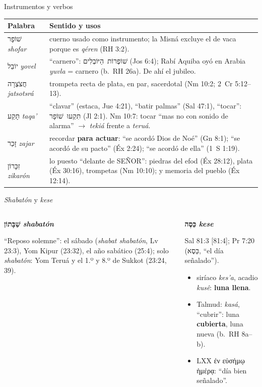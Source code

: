 \documentclass[hyperref={bookmarks=false},aspectratio=169]{beamer}
\newcommand{\heb}[1]{\mbox{\foreignlanguage{hebrew}{#1}}}
\newcommand{\grc}[1]{\foreignlanguage{ancientgreek}{#1}}
\newcommand{\SENOR}{S{\fontsize{0.78em}{1em}\selectfont EÑOR}}
\newcommand{\destacar}[1]{\textbf{\textcolor{tierraroja}{#1}}}
\begin{document}
\begin{frame}{Instrumentos y verbos}
\scriptsize\renewcommand{\arraystretch}{1.15}
\begin{tabular}{@{}L{2.5cm}L{9.0cm}@{}}
\toprule
\textbf{Palabra} & \textbf{Sentido y usos} \\ \midrule
\heb{שׁוֹפָר} \emph{shofar} & cuerno usado como instrumento; la Misná excluye el de vaca porque es \emph{qéren} (RH 3:2). \\
\heb{יוֹבֵל} \emph{yovel} & ``carnero'': \heb{שׁוֹפְרוֹת הַיּוֹבְלִים} (Jos 6:4); Rabí Aquiba oyó en Arabia \emph{yuvla} = carnero (b.~RH 26a). De ahí el jubileo. \\
\heb{חֲצֹצְרָה} \emph{jatsotsrá} & trompeta recta de plata, en par, sacerdotal (Nm 10:2; 2~Cr 5:12--13). \\
\heb{תָּקַע} \emph{taqa'} & ``clavar'' (estaca, Jue 4:21), ``batir palmas'' (Sal 47:1), ``tocar'': \heb{תִּקְעוּ שׁוֹפָר} (Jl 2:1). Nm 10:7: tocar ``mas no con sonido de alarma'' $\rightarrow$ \emph{tekiá} frente a \emph{teruá}. \\
\heb{זָכַר} \emph{zajar} & recordar \destacar{para actuar}: ``se acordó Dios de Noé'' (Gn 8:1); ``se acordó de su pacto'' (Éx 2:24); ``se acordó de ella'' (1~S 1:19). \\
\heb{זִכָּרוֹן} \emph{zikarón} & lo puesto ``delante de \SENOR'': piedras del efod (Éx 28:12), plata (Éx 30:16), trompetas (Nm 10:10); y memoria del pueblo (Éx 12:14). \\
\bottomrule
\end{tabular}
\end{frame}

\begin{frame}{\emph{Shabatón} y \emph{kese}}
\begin{columns}[t,onlytextwidth]
\begin{column}{0.48\textwidth}\small\RaggedRight
\textbf{\textcolor{tierraroja}{\heb{שַׁבָּתוֹן} \emph{shabatón}}}\par\smallskip
``Reposo solemne'': el sábado (\emph{shabat shabatón}, Lv 23:3), Yom Kipur (23:32), el año sabático (25:4); solo \emph{shabatón}: Yom Teruá y el 1.º y 8.º de Sukkot (23:24, 39).
\end{column}
\begin{column}{0.50\textwidth}\small\RaggedRight
\textbf{\textcolor{tierraroja}{\heb{כֵּסֶה} \emph{kese}}}\par\smallskip
Sal 81:3 [81:4]; Pr 7:20 (\heb{כֵּסֶא}, ``el día señalado'').
\begin{itemize}
\item siríaco \emph{kes'a}, acadio \emph{kusê}: \destacar{luna llena}.
\item Talmud: \emph{kasá}, ``cubrir'': luna \destacar{cubierta}, luna nueva (b.~RH 8a--b).
\item LXX \grc{ἐν εὐσήμῳ ἡμέρᾳ}: ``día bien señalado''.
\end{itemize}
\end{column}
\end{columns}
\end{frame}
\end{document}
